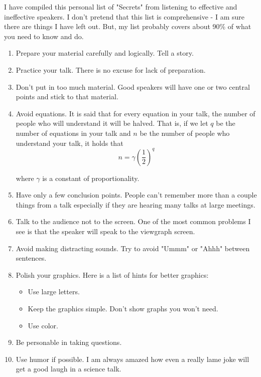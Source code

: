 \documentclass[12pt]{article}
\begin{document}
I have compiled this personal list of "Secrets" from listening to effective and ineffective speakers. I don't pretend that this list is comprehensive - I am sure there are things I have left out. But, my list probably covers about 90\% of what you need to know and do.
\begin{enumerate}

\item Prepare your material carefully and logically. Tell a story.

\item Practice your talk. There is no excuse for lack of preparation.

\item Don't put in too much material. Good speakers will have one or two central points and stick to that material.

\item Avoid equations. It is said that for every equation in your talk, the number of people who will understand it will be halved. That is, if we let $q$ be the number of equations in your talk and $n$ be the number of people who understand your talk, it holds that
\begin{equation}
n = \gamma (\frac{1}{2})^q
\end{equation}

where $\gamma$ is a constant of proportionality.

\item Have only a few conclusion points. People can't remember more than a couple things from a talk especially if they are hearing many talks at large meetings.

\item Talk to the audience not to the screen. One of the most common problems I see is that the speaker will speak to the viewgraph screen.

\item Avoid making distracting sounds. Try to avoid "Ummm" or "Ahhh" between sentences.

\item Polish your graphics. Here is a list of hints for better graphics:
\begin{itemize}

\item Use large letters.

\item Keep the graphics simple. Don't show graphs you won't need.

\item Use color.
\end{itemize}
\item Be personable in taking questions.

\item Use humor if possible. I am always amazed how even a really lame joke will get a good laugh in a science talk.
\end{enumerate}
\end{document}
